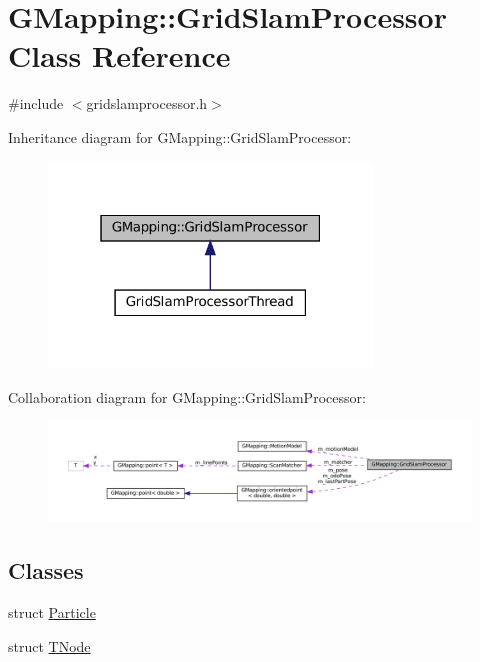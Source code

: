 \hypertarget{classGMapping_1_1GridSlamProcessor}{}\section{G\+Mapping\+:\+:Grid\+Slam\+Processor Class Reference}
\label{classGMapping_1_1GridSlamProcessor}


{\ttfamily \#include $<$gridslamprocessor.\+h$>$}



Inheritance diagram for G\+Mapping\+:\+:Grid\+Slam\+Processor\+:
\nopagebreak
\begin{figure}[H]
\begin{center}
\leavevmode
\includegraphics[width=244pt]{classGMapping_1_1GridSlamProcessor__inherit__graph}
\end{center}
\end{figure}


Collaboration diagram for G\+Mapping\+:\+:Grid\+Slam\+Processor\+:
\nopagebreak
\begin{figure}[H]
\begin{center}
\leavevmode
\includegraphics[width=350pt]{classGMapping_1_1GridSlamProcessor__coll__graph}
\end{center}
\end{figure}
\subsection*{Classes}
\begin{DoxyCompactItemize}
\item 
struct \hyperlink{structGMapping_1_1GridSlamProcessor_1_1Particle}{Particle}
\item 
struct \hyperlink{structGMapping_1_1GridSlamProcessor_1_1TNode}{T\+Node}
\end{DoxyCompactItemize}
